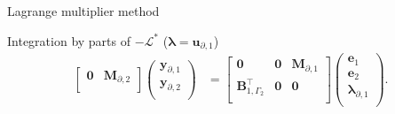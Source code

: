 \documentclass[aspectratio=169]{ISAE-Beamer}
\begin{document}
\begin{frame}{Lagrange multiplier method}
{\begin{block}{Integration by parts of $-\mathcal{L}^*$ ($\bm\lambda=\bm{u}_{\partial, 1}$) }
\begin{equation*}
\begin{aligned}
\begin{bmatrix}
\mathbf{0} & \mathbf{M}_{\partial, 2} \\
\end{bmatrix}
\begin{pmatrix}
\mathbf{y}_{\partial, 1} \\
\mathbf{y}_{\partial, 2} \\
\end{pmatrix}
&= \begin{bmatrix}
\mathbf{0} & \mathbf{0} & \mathbf{M}_{\partial, 1} \\
\mathbf{B}_{1, \Gamma_2}^\top & \mathbf{0} & \mathbf{0} \\
\end{bmatrix}\begin{pmatrix}
\mathbf{e}_{1} \\
\mathbf{e}_{2} \\
{\bm{\lambda}}_{\partial, 1} \\
\end{pmatrix}.
\end{aligned}
\end{equation*}
\end{block}
}



\end{frame}
\end{document}
